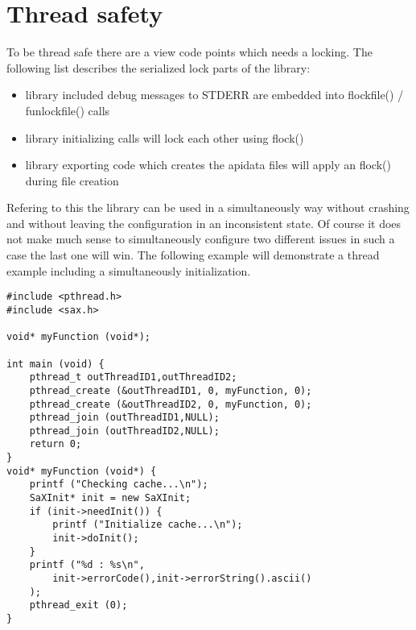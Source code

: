 \chapter{Thread safety}

To be thread safe there are a view code points which needs a
locking. The following list describes the serialized lock parts of
the library:

\begin{itemize}
\item library included debug messages to STDERR are embedded into
      flockfile() / funlockfile() calls
\item library initializing calls will lock each other using flock()
\item library exporting code which creates the apidata files
      will apply an flock() during file creation
\end{itemize}

Refering to this the library can be used in a simultaneously
way without crashing and without leaving the configuration in an
inconsistent state. Of course it does not make much sense to
simultaneously configure two different issues in such a case the
last one will win. The following example will demonstrate a thread
example including a simultaneously initialization.

\begin{Command}{12cm}
\begin{small}
\begin{verbatim}
#include <pthread.h>
#include <sax.h>

void* myFunction (void*);

int main (void) {
    pthread_t outThreadID1,outThreadID2;
    pthread_create (&outThreadID1, 0, myFunction, 0);
    pthread_create (&outThreadID2, 0, myFunction, 0);
    pthread_join (outThreadID1,NULL);
    pthread_join (outThreadID2,NULL);
    return 0;
}
void* myFunction (void*) {
    printf ("Checking cache...\n");
    SaXInit* init = new SaXInit;
    if (init->needInit()) {
        printf ("Initialize cache...\n");
        init->doInit();
    }
    printf ("%d : %s\n",
        init->errorCode(),init->errorString().ascii()
    );
    pthread_exit (0);
}
\end{verbatim}
\end{small}
\end{Command}

